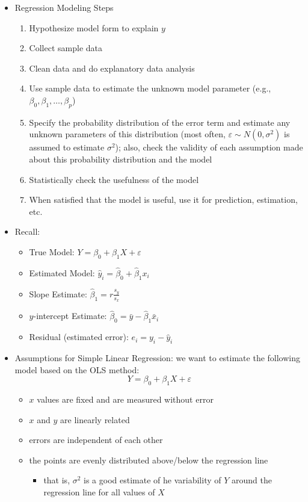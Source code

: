 \documentclass[12pt]{article}
\begin{document}
\begin{itemize}
\item Regression Modeling Steps \begin{enumerate} 
\item Hypothesize model form to explain $y$
\item Collect sample data 
\item Clean data and do explanatory data analysis
\item Use sample data to estimate the unknown model parameter (e.g., $\beta_0,\beta_1,\dots,\beta_p$)
\item Specify the probability distribution of the error term and estimate any unknown parameters of this distribution (most often, $\varepsilon \sim N(0, \sigma^2)$ is assumed to estimate $\sigma^2$); also, check the validity of each assumption made about this probability distribution and the model
\item Statistically check the usefulness of the model
\item When satisfied that the model is useful, use it for prediction, estimation, etc. 
\end{enumerate} 
\item Recall: \begin{itemize} 
\item True Model: $Y = \beta_0 + \beta_1X + \varepsilon$
\item Estimated Model: $\hat{y}_i = \hat{\beta}_0 + \hat{\beta}_1x_i$
\item Slope Estimate: $\hat{\beta}_1 = r \frac{s_y}{s_x}$
\item $y$-intercept Estimate: $\hat{\beta}_0 = \bar{y} - \hat{\beta}_1\bar{x}_i$
\item Residual (estimated error): $e_i = y_i - \hat{y}_i$ \end{itemize} 
\item Assumptions for Simple Linear Regression: we want to estimate the following model based on the OLS method: $$Y = \beta_0 + \beta_1X + \varepsilon$$ \begin{itemize} 
\item $x$ values are fixed and are measured without error 
\item $x$ and $y$ are linearly related 
\item errors are independent of each other 
\item the points are evenly distributed above/below the regression line \begin{itemize} 
\item that is, $\sigma^2$ is a good estimate of he variability of $Y$ around the regression line for all values of $X$ 

\end{itemize}
\end{itemize}
\end{itemize}
\end{document}
